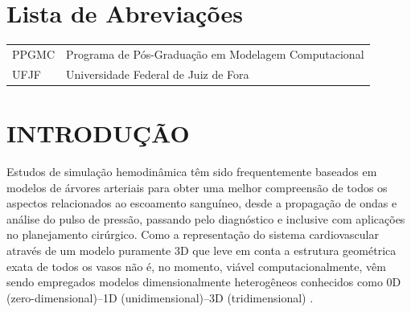 \documentclass[a4paper,12pt]{monografia}
\theoremstyle{plain}
\theoremstyle{definition}
\theoremstyle{remark}
\begin{document}



 \tableofcontents \thispagestyle{empty} \listoffigures
\thispagestyle{empty} \listoftables \thispagestyle{empty}



\chapter*{Lista de Abrevia\c{c}\~oes} 
\doublespacing  \begin{tabular}{l l}

PPGMC & Programa de Pós-Graduação em Modelagem Computacional \\
UFJF & Universidade Federal de Juiz de Fora 



\end{tabular}  \thispagestyle{empty}




%
%
%
\pagestyle{ruledheader}
 
\tableofcontents*
\cleardoublepage

\chapter{INTRODUÇÃO}\label{sec:intro}  %

Estudos de simulação hemodinâmica têm sido frequentemente baseados em modelos de árvores arteriais para obter uma melhor compreensão de todos os aspectos relacionados ao escoamento sanguíneo, desde a propagação de ondas e análise do pulso de pressão, passando pelo diagnóstico e inclusive com aplicações no planejamento cirúrgico. Como a representação do sistema cardiovascular através de um modelo puramente 3D que leve em conta a estrutura geométrica exata de todos os vasos não é, no momento, viável computacionalmente, vêm sendo empregados modelos dimensionalmente heterogêneos conhecidos como 0D (zero-dimensional)--1D (unidimensional)--3D (tridimensional) \cite{Formaggia2001}. 
\end{document}
